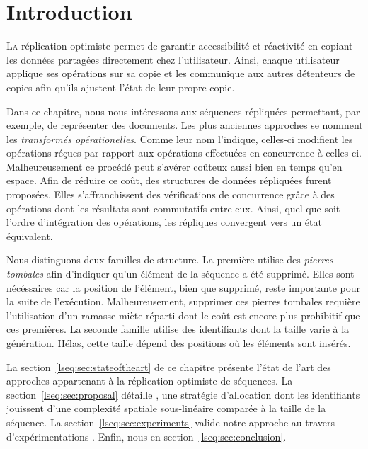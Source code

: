 
\section{Introduction}

\lettrine{L}a réplication optimiste permet de garantir accessibilité et
réactivité en copiant les données partagées directement chez
l'utilisateur. Ainsi, chaque utilisateur applique ses opérations sur sa copie et
les communique aux autres détenteurs de copies afin qu'ils ajustent l'état de
leur propre copie.

Dans ce chapitre, nous nous intéressons aux séquences répliquées  permettant, par exemple, de représenter des
documents. Les plus anciennes approches se nomment les \emph{transformés
  opérationelles}. Comme leur nom l'indique, celles-ci modifient les opérations
réçues par rapport aux opérations effectuées en concurrence à
celles-ci. Malheureusement ce procédé peut s'avérer coûteux aussi bien en temps
qu'en espace.  Afin de réduire ce coût, des structures de données répliquées
furent proposées. Elles s'affranchissent des vérifications de concurrence grâce
à des opérations dont les résultats sont commutatifs entre eux. Ainsi, quel que
soit l'ordre d'intégration des opérations, les répliques convergent vers un
état équivalent.

Nous distinguons deux familles de structure. La première utilise des
\emph{pierres tombales} afin d'indiquer qu'un élément de la séquence a été
supprimé. Elles sont nécéssaires car la position de l'élément, bien que
supprimé, reste importante pour la suite de l'exécution. Malheureusement,
supprimer ces pierres tombales requière l'utilisation d'un ramasse-miète réparti
dont le coût est encore plus prohibitif que ces premières. La seconde famille
utilise des identifiants dont la taille varie à la génération. Hélas, cette
taille dépend des positions où les éléments sont insérés. 

La section~\ref{lseq:sec:stateoftheart} de ce chapitre présente l'état de l'art
des approches appartenant à la réplication optimiste de séquences. La
section~\ref{lseq:sec:proposal} détaille \LSEQ, une stratégie d'allocation dont
les identifiants jouissent d'une complexité spatiale sous-linéaire comparée à la
taille de la séquence. La section~\ref{lseq:sec:experiments} valide notre
approche au travers d'expérimentations . Enfin, nous
 en section~\ref{lseq:sec:conclusion}.

